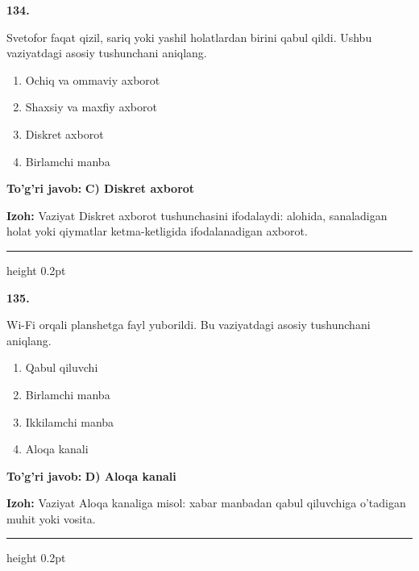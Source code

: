 \documentclass[10pt,a4paper,oneside]{article}
\begin{document}
\noindent\textbf{\color{ink}134.}
\par
Svetofor faqat qizil, sariq yoki yashil holatlardan birini qabul qildi. Ushbu vaziyatdagi asosiy tushunchani aniqlang.
\begin{enumerate}[label=\Alph*),leftmargin=9mm]
\item Ochiq va ommaviy axborot
\item Shaxsiy va maxfiy axborot
\item Diskret axborot
\item Birlamchi manba
\end{enumerate}
\begin{tcolorbox}[enhanced,breakable,colback=teal!4,colframe=teal!50!black,boxrule=0.5pt,arc=1.1mm,left=3mm,right=3mm,top=1.7mm,bottom=1.7mm,before skip=2mm,after skip=2mm]
\textbf{\color{teal}To'g'ri javob:} \textbf{C) Diskret axborot}
\par\smallskip
\textbf{Izoh:} Vaziyat Diskret axborot tushunchasini ifodalaydi: alohida, sanaladigan holat yoki qiymatlar ketma-ketligida ifodalanadigan axborot.
\end{tcolorbox}
\vspace{2mm}\hrule height 0.2pt \vspace{3mm}

\noindent\textbf{\color{ink}135.}
\par
Wi-Fi orqali planshetga fayl yuborildi. Bu vaziyatdagi asosiy tushunchani aniqlang.
\begin{enumerate}[label=\Alph*),leftmargin=9mm]
\item Qabul qiluvchi
\item Birlamchi manba
\item Ikkilamchi manba
\item Aloqa kanali
\end{enumerate}
\begin{tcolorbox}[enhanced,breakable,colback=teal!4,colframe=teal!50!black,boxrule=0.5pt,arc=1.1mm,left=3mm,right=3mm,top=1.7mm,bottom=1.7mm,before skip=2mm,after skip=2mm]
\textbf{\color{teal}To'g'ri javob:} \textbf{D) Aloqa kanali}
\par\smallskip
\textbf{Izoh:} Vaziyat Aloqa kanaliga misol: xabar manbadan qabul qiluvchiga o'tadigan muhit yoki vosita.
\end{tcolorbox}
\vspace{2mm}\hrule height 0.2pt \vspace{3mm}
\end{document}
